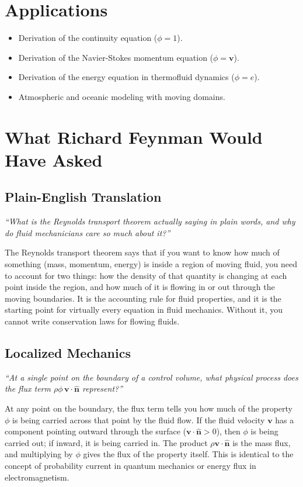 \section*{Applications}

\begin{itemize}
    \item Derivation of the continuity equation ($\phi = 1$).
    \item Derivation of the Navier-Stokes momentum equation ($\phi = \mathbf{v}$).
    \item Derivation of the energy equation in thermofluid dynamics ($\phi = e$).
    \item Atmospheric and oceanic modeling with moving domains.
\end{itemize}
\section*{What Richard Feynman Would Have Asked}

\subsection*{Plain-English Translation}
\textit{``What is the Reynolds transport theorem actually saying in plain words, and why do fluid mechanicians care so much about it?''}

The Reynolds transport theorem says that if you want to know how much of something (mass, momentum, energy) is inside a region of moving fluid, you need to account for two things: how the density of that quantity is changing at each point inside the region, and how much of it is flowing in or out through the moving boundaries. It is the accounting rule for fluid properties, and it is the starting point for virtually every equation in fluid mechanics. Without it, you cannot write conservation laws for flowing fluids.

\subsection*{Localized Mechanics}
\textit{``At a single point on the boundary of a control volume, what physical process does the flux term $\rho\phi\,\mathbf{v}\cdot\hat{\mathbf{n}}$ represent?''}

At any point on the boundary, the flux term tells you how much of the property $\phi$ is being carried across that point by the fluid flow. If the fluid velocity $\mathbf{v}$ has a component pointing outward through the surface ($\mathbf{v}\cdot\hat{\mathbf{n}} > 0$), then $\phi$ is being carried out; if inward, it is being carried in. The product $\rho\mathbf{v}\cdot\hat{\mathbf{n}}$ is the mass flux, and multiplying by $\phi$ gives the flux of the property itself. This is identical to the concept of probability current in quantum mechanics or energy flux in electromagnetism.


